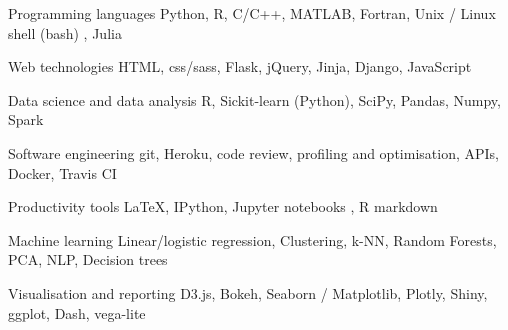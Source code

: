 


\begin{cvskills}


\cvskill
{Programming languages} %
{Python,  R, C/C++, MATLAB, Fortran, Unix / Linux shell (bash) , Julia} %


\cvskill
{Web technologies} %
{HTML, css/sass, Flask, jQuery, Jinja, Django, JavaScript } %


\cvskill
{Data science and data analysis} %
{ R, Sickit-learn (Python), SciPy, Pandas, Numpy, Spark} %


\cvskill
{Software engineering } %
{git, Heroku, code review, profiling and optimisation, APIs, Docker, Travis CI} %


\cvskill
{Productivity tools } %
{LaTeX, IPython, Jupyter notebooks , R markdown} %


\cvskill
{Machine learning} %
{Linear/logistic regression, Clustering, k-NN, Random Forests, PCA, NLP, Decision trees}
%


\cvskill
{Visualisation and reporting } %
{D3.js, Bokeh, Seaborn / Matplotlib, Plotly, Shiny, ggplot, Dash, vega-lite} %


\end{cvskills}
